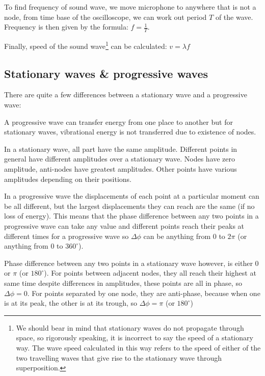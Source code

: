 To find frequency of sound wave, we move microphone to anywhere that is not a node, from time base of the oscilloscope, we can work out period $T$ of the wave. Frequency is then given by the formula: $f=\frac{1}{T}$.

Finally,  speed of the sound wave\footnote{We should bear in mind that stationary waves do not propagate through space, so rigorously speaking, it is incorrect to say the speed of a stationary way. The wave speed calculated in this way refers to the speed of either of the two travelling waves that give rise to the stationary wave through superposition.} can be calculated: $v=\lambda f$




\subsection{Stationary waves \& progressive waves}

There are quite a few differences between a stationary wave and a progressive wave:

A progressive wave can transfer energy from one place to another but for stationary waves, vibrational energy is not transferred due to existence of nodes. 

In a stationary wave, all part have the same amplitude. Different points in general have different amplitudes over a stationary wave. Nodes have zero amplitude, anti-nodes have greatest amplitudes. Other points have various amplitudes depending on their positions.

In a progressive wave the displacements of each point at a particular moment can be all different, but the largest displacements they can reach are the same (if no loss of energy). This means that the phase difference between any two points in a progressive wave can take any value and different points reach their peaks at different times for a progressive wave so $\Delta \phi$ can be anything from 0 to $2\pi$ (or anything from 0 to $360^\circ$).

Phase difference between any two points in a stationary wave however, is either 0 or $\pi$ (or $180^\circ$). For points between adjacent nodes, they all reach their highest at same time despite differences in amplitudes, these points are all in phase, so $\Delta \phi=0$.
For points separated by one node, they are anti-phase, because when one is at its peak, the other is at its trough, so $\Delta \phi = \pi$ (or $180^\circ$)


